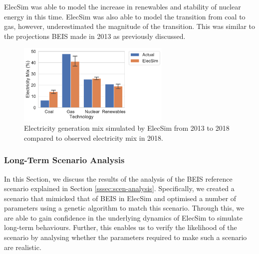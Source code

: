 ElecSim was able to model the increase in renewables and stability of nuclear energy in this time. ElecSim was also able to model the transition from coal to gas, however, underestimated the magnitude of the transition. This was similar to the projections BEIS made in 2013 as previously discussed.

\begin{figure}
	\centering
	\includegraphics[width=0.65\textwidth]{Chapter4/figures/e-Energy-2020/results/best_run_coal_dropout_95_ci.pdf}
	\caption{Electricity generation mix simulated by ElecSim from 2013 to 2018 compared to observed electricity mix in 2018.}
	\label{fig:uk_validated_results_2018}
\end{figure}







\subsubsection{Long-Term Scenario Analysis}

In this Section, we discuss the results of the analysis of the BEIS reference scenario explained in Section \ref{sssec:scen-analysis}. Specifically, we created a scenario that mimicked that of BEIS in ElecSim and optimised a number of parameters using a genetic algorithm to match this scenario. Through this, we are able to gain confidence in the underlying dynamics of ElecSim to simulate long-term behaviours. Further, this enables us to verify the likelihood of the scenario by analysing whether the parameters required to make such a scenario are realistic.

